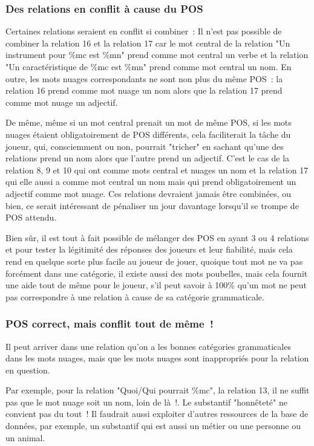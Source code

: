 \documentclass[a4paper,11pt,french]{article}
\begin{document}
\subsubsection{Des relations en conflit à cause du POS}
Certaines relations seraient en conflit si combiner~: Il n'est pas possible de combiner la relation 16 et la relation 17 car le mot central de la relation "Un instrument pour \%mc est \%mn" prend comme mot central un verbe et la relation "Un caractéristique de \%mc est \%mn" prend comme mot central un nom. En outre, les mots nuages correspondants ne sont non plus du même POS~: la relation 16 prend comme mot nuage un nom alors que la relation 17 prend comme mot nuage un adjectif. 

De même, même si un mot central prenait un mot de même POS, si les mots nuages étaient obligatoirement de POS différents, cela faciliterait la tâche du joueur, qui, consciemment ou non, pourrait "tricher" en sachant qu'une des relations prend un nom alors que l'autre prend un adjectif. C'est le cas de la relation 8, 9 et 10 qui ont comme mots central et nuages un nom et la relation 17 qui elle aussi a comme mot central un nom mais qui prend obligatoirement un adjectif comme mot nuage. Ces relations devraient jamais être combinées, ou bien, ce serait intéressant de pénaliser un jour davantage lorsqu'il se trompe de POS attendu. 



Bien sûr, il est tout à fait possible de mélanger des POS en ayant 3 ou 4 relations et pour tester la légitimité des réponses des joueurs et leur fiabilité, mais cela rend en quelque sorte plus facile au joueur de jouer, quoique tout mot ne va pas forcément dans une catégorie, il existe aussi des mots poubelles, mais cela fournit une aide tout de même pour le joueur, s'il peut savoir à 100\% qu'un mot ne peut pas correspondre à une relation à cause de sa catégorie grammaticale. 



\subsubsection{POS correct, mais conflit tout de même~!}
Il peut arriver dans une relation qu'on a les bonnes catégories grammaticales dans les mots nuages, mais que les mots nuages sont inappropriés pour la relation en question. 

Par exemple, pour la relation "Quoi/Qui pourrait \%mc", la relation 13, il ne suffit pas que le mot nuage soit un nom, loin de là~!. Le substantif "honnêteté" ne convient pas du tout~! Il faudrait aussi exploiter d'autres ressources de la base de données, par exemple, un substantif qui est aussi un métier ou une personne ou un animal.
\end{document}
